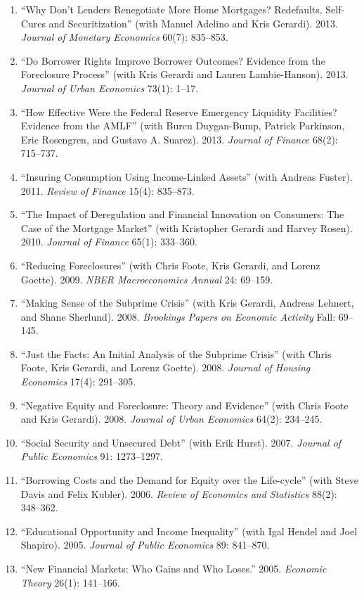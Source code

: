 \documentclass[11pt]{article}
\begin{document}
\begin{enumerate}[leftmargin=*, nosep]
\item ``Why Don't Lenders Renegotiate More Home Mortgages? Redefaults, Self-Cures and Securitization'' (with Manuel Adelino and Kris Gerardi). 2013. \textit{Journal of Monetary Economics} 60(7): 835--853.
\item ``Do Borrower Rights Improve Borrower Outcomes? Evidence from the Foreclosure Process'' (with Kris Gerardi and Lauren Lambie-Hanson). 2013. \textit{Journal of Urban Economics} 73(1): 1--17.
\item ``How Effective Were the Federal Reserve Emergency Liquidity Facilities? Evidence from the AMLF'' (with Burcu Duygan-Bump, Patrick Parkinson, Eric Rosengren, and Gustavo A. Suarez). 2013. \textit{Journal of Finance} 68(2): 715--737.
\item ``Insuring Consumption Using Income-Linked Assets'' (with Andreas Fuster). 2011. \textit{Review of Finance} 15(4): 835--873.
\item ``The Impact of Deregulation and Financial Innovation on Consumers: The Case of the Mortgage Market'' (with Kristopher Gerardi and Harvey Rosen). 2010. \textit{Journal of Finance} 65(1): 333--360.
\item ``Reducing Foreclosures'' (with Chris Foote, Kris Gerardi, and Lorenz Goette). 2009. \textit{NBER Macroeconomics Annual} 24: 69--159.
\item ``Making Sense of the Subprime Crisis'' (with Kris Gerardi, Andreas Lehnert, and Shane Sherlund). 2008. \textit{Brookings Papers on Economic Activity} Fall: 69--145.
\item ``Just the Facts: An Initial Analysis of the Subprime Crisis'' (with Chris Foote, Kris Gerardi, and Lorenz Goette). 2008. \textit{Journal of Housing Economics} 17(4): 291--305.
\item ``Negative Equity and Foreclosure: Theory and Evidence'' (with Chris Foote and Kris Gerardi). 2008. \textit{Journal of Urban Economics} 64(2): 234--245.
\item ``Social Security and Unsecured Debt'' (with Erik Hurst). 2007. \textit{Journal of Public Economics} 91: 1273--1297.
\item ``Borrowing Costs and the Demand for Equity over the Life-cycle'' (with Steve Davis and Felix Kubler). 2006. \textit{Review of Economics and Statistics} 88(2): 348--362.
\item ``Educational Opportunity and Income Inequality'' (with Igal Hendel and Joel Shapiro). 2005. \textit{Journal of Public Economics} 89: 841--870.
\item ``New Financial Markets: Who Gains and Who Loses.'' 2005. \textit{Economic Theory} 26(1): 141--166.
\end{enumerate}
\end{document}
